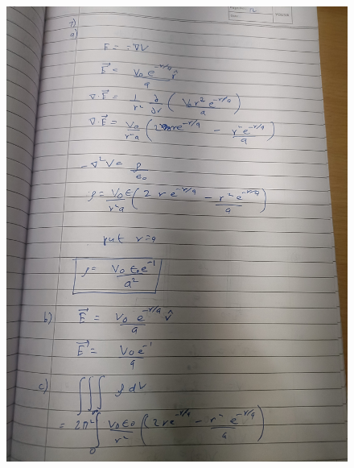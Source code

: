 \documentclass{article}
\begin{document}
\begin{figure}[H]
    \centering
    \includegraphics[width=\textwidth]{figs/written/12.jpg}
\end{figure}
\end{document}

